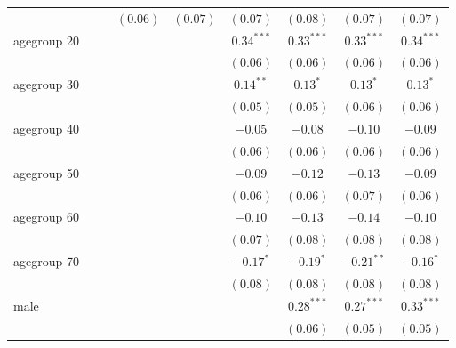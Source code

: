 \begin{table}
\begin{center}
\begin{tabular}{l c c c c c c c c}
                &              &              & $(0.06)$     & $(0.07)$     & $(0.07)$     & $(0.08)$     & $(0.07)$      & $(0.07)$      \\
agegroup 20     &              &              &              &              & $0.34^{***}$ & $0.33^{***}$ & $0.33^{***}$  & $0.34^{***}$  \\
                &              &              &              &              & $(0.06)$     & $(0.06)$     & $(0.06)$      & $(0.06)$      \\
agegroup 30     &              &              &              &              & $0.14^{**}$  & $0.13^{*}$   & $0.13^{*}$    & $0.13^{*}$    \\
                &              &              &              &              & $(0.05)$     & $(0.05)$     & $(0.06)$      & $(0.06)$      \\
agegroup 40     &              &              &              &              & $-0.05$      & $-0.08$      & $-0.10$       & $-0.09$       \\
                &              &              &              &              & $(0.06)$     & $(0.06)$     & $(0.06)$      & $(0.06)$      \\
agegroup 50     &              &              &              &              & $-0.09$      & $-0.12$      & $-0.13$       & $-0.09$       \\
                &              &              &              &              & $(0.06)$     & $(0.06)$     & $(0.07)$      & $(0.06)$      \\
agegroup 60     &              &              &              &              & $-0.10$      & $-0.13$      & $-0.14$       & $-0.10$       \\
                &              &              &              &              & $(0.07)$     & $(0.08)$     & $(0.08)$      & $(0.08)$      \\
agegroup 70     &              &              &              &              & $-0.17^{*}$  & $-0.19^{*}$  & $-0.21^{**}$  & $-0.16^{*}$   \\
                &              &              &              &              & $(0.08)$     & $(0.08)$     & $(0.08)$      & $(0.08)$      \\
male            &              &              &              &              &              & $0.28^{***}$ & $0.27^{***}$  & $0.33^{***}$  \\
                &              &              &              &              &              & $(0.06)$     & $(0.05)$      & $(0.05)$      \\

\end{tabular}
\end{center}
\end{table}
